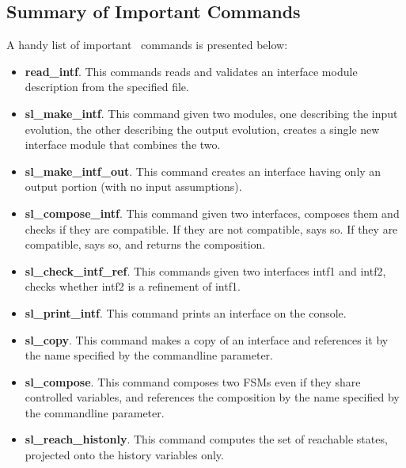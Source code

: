 \subsection{Summary of Important Commands}
A handy list of important \chai \ commands is presented below:
\begin{itemize}
    \item \textbf{read\_intf}. This commands reads and validates an interface module description from the specified file.
    \item \textbf{sl\_make\_intf}. This command given two modules, one describing the input evolution, the other describing the output evolution, creates a single new interface module that combines the two.
    \item \textbf{sl\_make\_intf\_out}. This command creates an interface having only an output portion (with no input
    assumptions).
    \item \textbf{sl\_compose\_intf}. This command given two interfaces, composes them and checks if they are compatible. If they are not compatible, says so. If they are compatible, says so, and returns the composition.
    \item \textbf{sl\_check\_intf\_ref}. This commands given two interfaces intf1 and intf2, checks whether intf2 is a refinement of intf1.
    \item \textbf{sl\_print\_intf}. This command prints an interface on the console.
    \item \textbf{sl\_copy}. This command makes a copy of an interface and references it by the name specified by the commandline parameter.
    \item \textbf{sl\_compose}. This command composes two FSMs even if they share controlled variables, and references the composition by the name specified by the commandline parameter.
    \item \textbf{sl\_reach\_histonly}. This command computes the set of reachable states, projected onto the history variables only.
\end{itemize}


